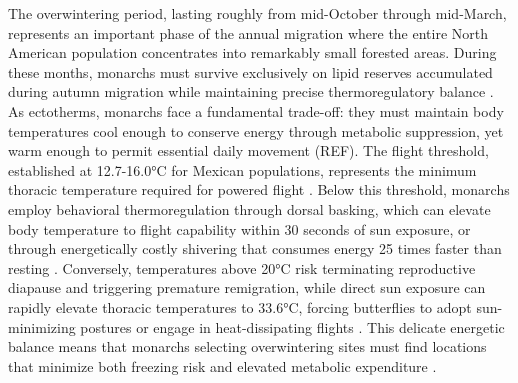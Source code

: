 The overwintering period, lasting roughly from mid-October through mid-March, represents an important phase of the annual migration where the entire North American population concentrates into remarkably small forested areas. During these months, monarchs must survive exclusively on lipid reserves accumulated during autumn migration while maintaining precise thermoregulatory balance \citep{chaplinEnergyReservesMetabolic1982,mastersThermoregulatoryBehaviorAdaptations1988}. As ectotherms, monarchs face a fundamental trade-off: they must maintain body temperatures cool enough to conserve energy through metabolic suppression, yet warm enough to permit essential daily movement (REF). The flight threshold, established at 12.7-16.0°C for Mexican populations, represents the minimum thoracic temperature required for powered flight \citep{mastersThermoregulatoryBehaviorAdaptations1988}. Below this threshold, monarchs employ behavioral thermoregulation through dorsal basking, which can elevate body temperature to flight capability within 30 seconds of sun exposure, or through energetically costly shivering that consumes energy 25 times faster than resting \citep{mastersThermoregulatoryBehaviorAdaptations1988}. Conversely, temperatures above 20°C risk terminating reproductive diapause and triggering premature remigration, while direct sun exposure can rapidly elevate thoracic temperatures to 33.6°C, forcing butterflies to adopt sun-minimizing postures or engage in heat-dissipating flights \citep{barkerEffectPhotoperiodTemperature1976,hermanHormonallyMediatedEvents1985}. This delicate energetic balance means that monarchs selecting overwintering sites must find locations that minimize both freezing risk and elevated metabolic expenditure \citep{mastersThermoregulatoryBehaviorAdaptations1988}.

